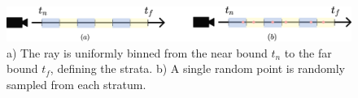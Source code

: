 \begin{figure}[h]
    \centering
    \includegraphics[width=1.0\textwidth]{figures/stratified-sampling.png}
    \caption{a) The ray is uniformly binned from the near bound $t_n$ to the far bound $t_f$, defining the strata. b) A single random point is randomly sampled from each stratum.}
    \label{fig:stratified-sampling}
\end{figure}